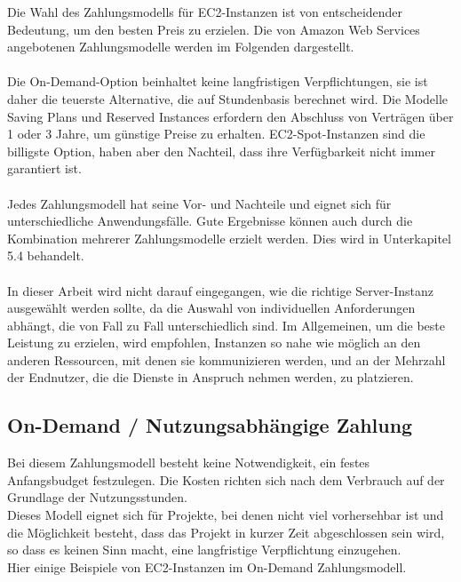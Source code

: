 Die Wahl des Zahlungsmodells für EC2-Instanzen ist von entscheidender Bedeutung, um den besten Preis zu erzielen.
Die von Amazon Web Services angebotenen Zahlungsmodelle werden im Folgenden dargestellt.
\\\\
Die On-Demand-Option %
beinhaltet keine langfristigen Verpflichtungen, sie ist daher die teuerste Alternative, die auf Stundenbasis berechnet wird. Die Modelle Saving Plans und Reserved Instances erfordern den Abschluss von Verträgen über 1 oder 3 Jahre, um günstige Preise zu erhalten. EC2-Spot-Instanzen sind die billigste Option, haben aber den Nachteil, dass ihre Verfügbarkeit nicht immer garantiert ist.
\\\\
Jedes Zahlungsmodell hat seine Vor- und Nachteile und eignet sich für unterschiedliche Anwendungsfälle. Gute Ergebnisse können auch durch die Kombination mehrerer Zahlungsmodelle erzielt werden. Dies wird in Unterkapitel 5.4 behandelt.
\\\\
In dieser Arbeit wird nicht darauf eingegangen, wie die richtige Server-Instanz ausgewählt werden sollte, da die Auswahl von individuellen Anforderungen abhängt, die von Fall zu Fall unterschiedlich sind. Im Allgemeinen, um die beste Leistung zu erzielen, wird empfohlen, Instanzen so nahe wie möglich an den anderen Ressourcen, mit denen sie kommunizieren werden, und an der Mehrzahl der Endnutzer, die die Dienste in Anspruch nehmen werden, zu platzieren.

\subsection{On-Demand / Nutzungsabhängige Zahlung}
Bei diesem Zahlungsmodell besteht keine Notwendigkeit, ein festes Anfangsbudget festzulegen. Die Kosten richten sich nach dem Verbrauch auf der Grundlage der Nutzungsstunden.
\\
Dieses Modell eignet sich für Projekte, bei denen nicht viel vorhersehbar ist und die Möglichkeit besteht, dass das Projekt in kurzer Zeit abgeschlossen sein wird, so dass es keinen Sinn macht, eine langfristige Verpflichtung einzugehen.
\\
Hier einige Beispiele von EC2-Instanzen im On-Demand Zahlungsmodell.

